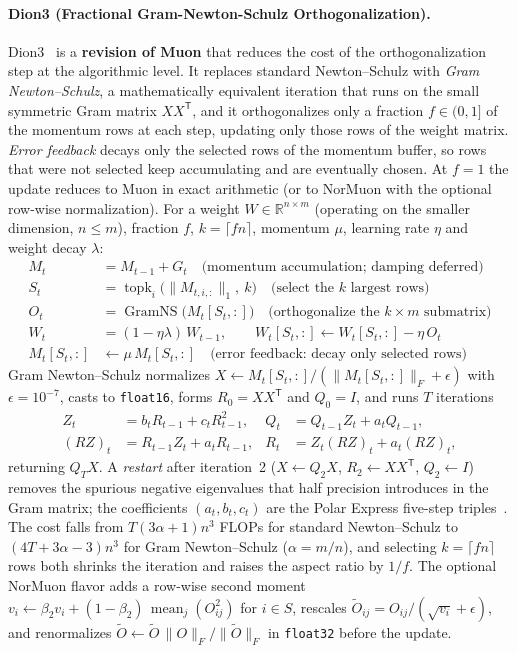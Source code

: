 \paragraph{Dion3 (Fractional Gram-Newton-Schulz Orthogonalization).}
Dion3~\citep{amsel_dion3_2026} is a \textbf{revision of Muon} that reduces the cost of the orthogonalization step at the algorithmic level. It replaces standard Newton--Schulz with \emph{Gram Newton--Schulz}, a mathematically equivalent iteration that runs on the small symmetric Gram matrix $XX^{\mathsf T}$, and it orthogonalizes only a fraction $f \in (0,1]$ of the momentum rows at each step, updating only those rows of the weight matrix. \emph{Error feedback} decays only the selected rows of the momentum buffer, so rows that were not selected keep accumulating and are eventually chosen. At $f = 1$ the update reduces to Muon in exact arithmetic (or to NorMuon with the optional row-wise normalization). For a weight $W \in \mathbb{R}^{n \times m}$ (operating on the smaller dimension, $n \le m$), fraction $f$, $k = \lceil f n \rceil$, momentum $\mu$, learning rate $\eta$ and weight decay $\lambda$:
\begin{align}
M_t &= M_{t-1} + G_t \quad\text{(momentum accumulation; damping deferred)} \\
S_t &= \operatorname{topk}_{i}\bigl(\lVert M_{t,i,:}\rVert_1,\ k\bigr) \quad\text{(select the } k \text{ largest rows)} \\
O_t &= \operatorname{GramNS}\bigl(M_t[S_t,:]\bigr) \quad\text{(orthogonalize the } k \times m \text{ submatrix)} \\
W_t &= (1 - \eta\lambda)\, W_{t-1}, \qquad W_t[S_t,:] \gets W_t[S_t,:] - \eta\, O_t \\
M_t[S_t,:] &\gets \mu\, M_t[S_t,:] \quad\text{(error feedback: decay only selected rows)}
\end{align}
Gram Newton--Schulz normalizes $X \gets M_t[S_t,:]/(\lVert M_t[S_t,:]\rVert_F + \epsilon)$ with $\epsilon = 10^{-7}$, casts to \texttt{float16}, forms $R_0 = X X^{\mathsf T}$ and $Q_0 = I$, and runs $T$ iterations
\begin{align}
Z_t &= b_t R_{t-1} + c_t R_{t-1}^2, &
Q_t &= Q_{t-1} Z_t + a_t Q_{t-1}, \\
(RZ)_t &= R_{t-1} Z_t + a_t R_{t-1}, &
R_t &= Z_t (RZ)_t + a_t (RZ)_t,
\end{align}
returning $Q_T X$. A \emph{restart} after iteration~2 ($X \gets Q_2 X$, $R_2 \gets X X^{\mathsf T}$, $Q_2 \gets I$) removes the spurious negative eigenvalues that half precision introduces in the Gram matrix; the coefficients $(a_t,b_t,c_t)$ are the Polar Express five-step triples~\citep{amsel_polar_express_2026}. The cost falls from $T(3\alpha+1)n^3$ FLOPs for standard Newton--Schulz to $(4T+3\alpha-3)n^3$ for Gram Newton--Schulz ($\alpha = m/n$), and selecting $k = \lceil f n \rceil$ rows both shrinks the iteration and raises the aspect ratio by $1/f$. The optional NorMuon flavor adds a row-wise second moment $v_i \gets \beta_2 v_i + (1-\beta_2)\,\operatorname{mean}_j(O_{ij}^2)$ for $i \in S$, rescales $\tilde O_{ij} = O_{ij}/(\sqrt{v_i}+\epsilon)$, and renormalizes $\tilde O \gets \tilde O\,\lVert O\rVert_F/\lVert\tilde O\rVert_F$ in \texttt{float32} before the update.

